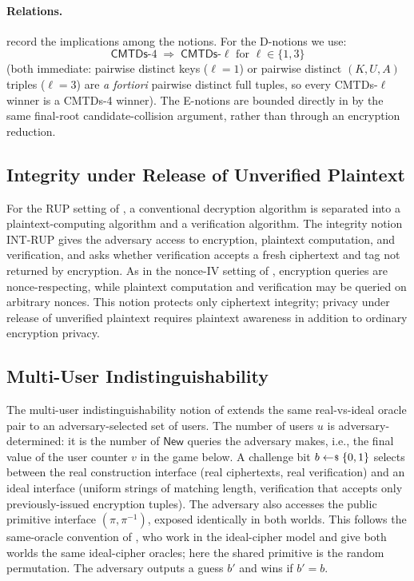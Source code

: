 \paragraph{Relations.}
\cite[Figs.~4 and~5]{BH22} record the implications among the notions.
For the D-notions we use:
\[
  \mathsf{CMTDs}\text{-}4 \;\Rightarrow\;
  \mathsf{CMTDs}\text{-}\ell \text{ for } \ell \in \{1, 3\}
\]
(both immediate: pairwise distinct keys ($\ell = 1$) or pairwise
distinct $(K, U, A)$ triples ($\ell = 3$) are \emph{a fortiori} pairwise
distinct full tuples, so every CMTDs-$\ell$ winner is a CMTDs-4 winner).
The E-notions are bounded directly in  by
the same final-root candidate-collision argument, rather than through an
encryption reduction.

\subsection{Integrity under Release of Unverified Plaintext}
\label{sec:rup-defs}

For the RUP setting of \cite{ABLMMY14}, a conventional decryption algorithm is
separated into a plaintext-computing algorithm and a verification algorithm.
The integrity notion \textsf{INT-RUP} gives the adversary access to encryption,
plaintext computation, and verification, and asks whether verification accepts a
fresh ciphertext and tag not returned by encryption. As in the nonce-IV setting
of \cite{ABLMMY14}, encryption queries are nonce-respecting, while plaintext
computation and verification may be queried on arbitrary nonces. This notion
protects only ciphertext integrity; privacy under release of unverified
plaintext requires plaintext awareness in addition to ordinary encryption
privacy.

\subsection{Multi-User Indistinguishability}
\label{sec:mu-ind}

The multi-user indistinguishability notion of \cite[Fig.~3]{BT16}
extends the same real-vs-ideal oracle pair to an adversary-selected set
of users. The number of users $u$ is adversary-determined: it is the
number of $\mathsf{New}$ queries the adversary makes, i.e., the final
value of the user counter $v$ in the game below. A challenge bit $b
\sample \bits$ selects between the
real construction interface (real ciphertexts, real verification) and
an ideal interface (uniform strings of matching length, verification
that accepts only previously-issued encryption tuples). The adversary
also accesses the public primitive interface $(\pi,\pi^{-1})$, exposed
identically in both worlds. This follows the same-oracle convention of
\cite{BT16}, who work in the ideal-cipher model and give both worlds
the same ideal-cipher oracles; here the shared primitive is the random
permutation. The adversary
outputs a guess $b'$ and wins if $b' = b$.

